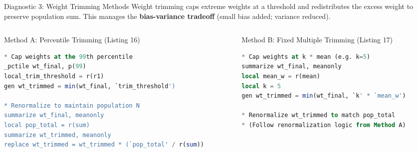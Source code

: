 \documentclass[10pt, aspectratio=169]{beamer}
\begin{document}
\begin{frame}[fragile]{Diagnostic 3: Weight Trimming Methods}
  Weight trimming caps extreme weights at a threshold and redistributes the excess weight to preserve population sum. This manages the \textbf{bias-variance tradeoff} (small bias added; variance reduced).

  \begin{columns}[T]
    \begin{column}{0.48\textwidth}
      \begin{block}{Method A: Percentile Trimming (Listing 16)}
\begin{lstlisting}[language=SQL]
* Cap weights at the 99th percentile
_pctile wt_final, p(99)
local_trim_threshold = r(r1)
gen wt_trimmed = min(wt_final, `trim_threshold')

* Renormalize to maintain population N
summarize wt_final, meanonly
local pop_total = r(sum)
summarize wt_trimmed, meanonly
replace wt_trimmed = wt_trimmed * (`pop_total' / r(sum))
\end{lstlisting}
      \end{block}
    \end{column}
    \begin{column}{0.48\textwidth}
      \begin{block}{Method B: Fixed Multiple Trimming (Listing 17)}
\begin{lstlisting}[language=SQL]
* Cap weights at k * mean (e.g. k=5)
summarize wt_final, meanonly
local mean_w = r(mean)
local k = 5
gen wt_trimmed = min(wt_final, `k' * `mean_w')

* Renormalize wt_trimmed to match pop_total
* (Follow renormalization logic from Method A)
\end{lstlisting}
      \end{block}
    \end{column}
  \end{columns}
\end{frame}
\end{document}
